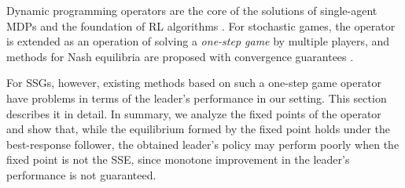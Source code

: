 \documentclass{acml}
\begin{document}


Dynamic programming operators are the core of the solutions of single-agent MDPs and the foundation of RL algorithms \citep{Sutton2018-jf}.
For stochastic games, the operator is extended as an operation of solving a \emph{one-step game} by multiple players, and methods for Nash equilibria are proposed with convergence guarantees \citep{Hu2003-vy}.

For SSGs, however, existing methods based on such a one-step game operator \citep{Bucarey2022-ro,Zhang2020-hw} have problems in terms of the leader's performance in our setting.
This section describes it in detail.
In summary, we analyze the fixed points of the operator and show that, while the equilibrium formed by the fixed point holds under the best-response follower, the obtained leader's policy may perform poorly when the fixed point is not the SSE, since monotone improvement in the leader’s performance is not guaranteed. 
\end{document}
